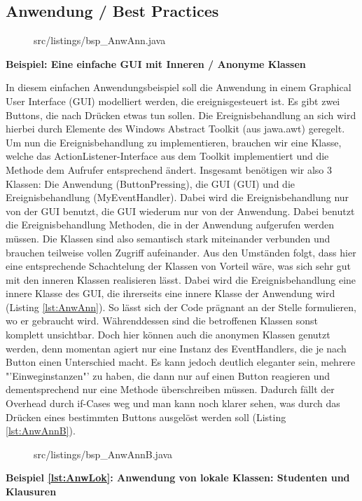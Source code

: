 \newpage
\subsection{Anwendung / Best Practices}


\begin{figure}[H]
\lstset{language=Java}
 {src/listings/bsp_AnwAnn.java}
\end{figure}


{\bf Beispiel: Eine einfache GUI mit Inneren / Anonyme Klassen}

In diesem einfachen Anwendungsbeispiel soll die Anwendung in einem Graphical User Interface (GUI) modelliert werden, die ereignisgesteuert ist.
Es gibt zwei Buttons, die nach Drücken etwas tun sollen.
Die Ereignisbehandlung an sich wird hierbei durch Elemente des Windows Abstract Toolkit (aus jawa.awt) geregelt.
Um nun die Ereignisbehandlung zu implementieren, brauchen wir eine Klasse, welche das ActionListener-Interface aus dem Toolkit implementiert und die Methode dem Aufrufer entsprechend ändert.
Insgesamt benötigen wir also 3 Klassen: Die Anwendung (ButtonPressing), die GUI (GUI) und die Ereignisbehandlung (MyEventHandler). Dabei wird die Ereignisbehandlung nur von der GUI benutzt, die GUI wiederum nur von der Anwendung. Dabei benutzt die Ereignisbehandlung Methoden, die in der Anwendung aufgerufen werden müssen.
Die Klassen sind also semantisch stark miteinander verbunden und brauchen teilweise vollen Zugriff aufeinander.
Aus den Umständen folgt, dass hier eine entsprechende Schachtelung der Klassen von Vorteil wäre, was sich sehr gut mit den inneren Klassen realisieren lässt.
Dabei wird die Ereignisbehandlung eine innere Klasse des GUI, die ihrerseits eine innere Klasse der Anwendung wird (Listing \ref{lst:AnwAnn}).
So lässt sich der Code prägnant an der Stelle formulieren, wo er gebraucht wird.
Währenddessen sind die betroffenen Klassen sonst komplett unsichtbar.
Doch hier können auch die anonymen Klassen genutzt werden, denn momentan agiert nur eine Instanz des EventHandlers, die je nach Button einen Unterschied macht. Es kann jedoch deutlich eleganter sein, mehrere "'Einweginstanzen"' zu haben, die dann nur auf einen Button reagieren und dementsprechend nur eine Methode überschreiben müssen.
Dadurch fällt der Overhead durch if-Cases weg und man kann noch klarer sehen, was durch das Drücken eines bestimmten Buttons ausgelöst werden soll (Listing \ref{lst:AnwAnnB}).
\\
\begin{figure}[H]
\lstset{language=Java}
 {src/listings/bsp_AnwAnnB.java}
\end{figure}
\newpage
{\bf Beispiel \ref{lst:AnwLok}: Anwendung von lokale Klassen: Studenten und Klausuren}

